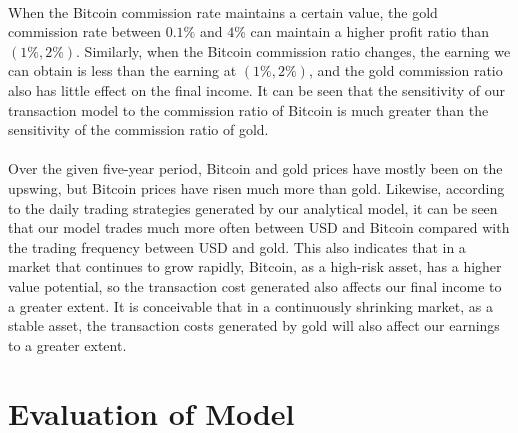 \documentclass[12pt]{article}
\begin{document}
\paragraph{}
When the Bitcoin commission rate maintains a certain value, the gold commission rate between $0.1\%$ and $4\%$ can maintain a higher profit ratio than $(1\%, 2\%)$.
Similarly, when the Bitcoin commission ratio changes, the earning we can obtain is less than the earning at $(1\%, 2\%)$, and the gold commission ratio also has little effect on the final income. It can be seen that the sensitivity of our transaction model to the commission ratio of Bitcoin is much greater than the sensitivity of the commission ratio of gold.
\paragraph{}
Over the given five-year period, Bitcoin and gold prices have mostly been on the upswing, but Bitcoin prices have risen much more than gold. Likewise, according to the daily trading strategies generated by our analytical model, it can be seen that our model trades much more often between USD and Bitcoin compared with the trading frequency between USD and gold. This also indicates that in a market that continues to grow rapidly, Bitcoin, as a high-risk asset, has a higher value potential, so the transaction cost generated also affects our final income to a greater extent. It is conceivable that in a continuously shrinking market, as a stable asset, the transaction costs generated by gold will also affect our earnings to a greater extent.

\section{Evaluation of Model}
\end{document}
